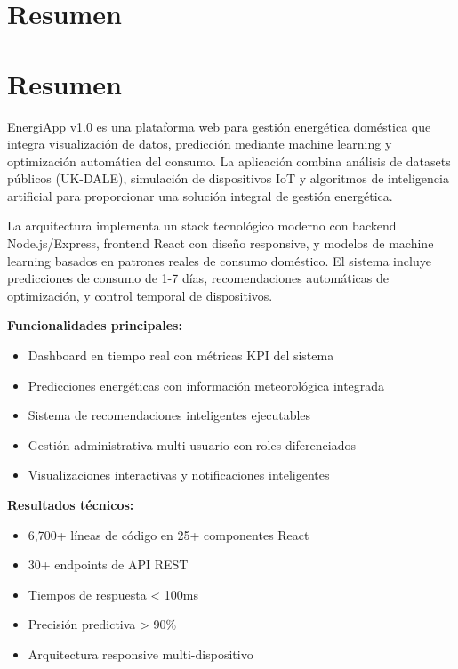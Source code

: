 \documentclass[12pt,a4paper,spanish]{book}
\begin{document}
\frontmatter

\chapter*{Resumen}

\chapter*{Resumen}

EnergiApp v1.0 es una plataforma web para gestión energética doméstica que integra visualización de datos, predicción mediante machine learning y optimización automática del consumo. La aplicación combina análisis de datasets públicos (UK-DALE), simulación de dispositivos IoT y algoritmos de inteligencia artificial para proporcionar una solución integral de gestión energética.

La arquitectura implementa un stack tecnológico moderno con backend Node.js/Express, frontend React con diseño responsive, y modelos de machine learning basados en patrones reales de consumo doméstico. El sistema incluye predicciones de consumo de 1-7 días, recomendaciones automáticas de optimización, y control temporal de dispositivos.

\textbf{Funcionalidades principales:}
\begin{itemize}
    \item Dashboard en tiempo real con métricas KPI del sistema
    \item Predicciones energéticas con información meteorológica integrada
    \item Sistema de recomendaciones inteligentes ejecutables
    \item Gestión administrativa multi-usuario con roles diferenciados
    \item Visualizaciones interactivas y notificaciones inteligentes
\end{itemize}

\textbf{Resultados técnicos:}
\begin{itemize}
    \item 6,700+ líneas de código en 25+ componentes React
    \item 30+ endpoints de API REST
    \item Tiempos de respuesta < 100ms
    \item Precisión predictiva > 90\%
    \item Arquitectura responsive multi-dispositivo
\end{itemize}
\end{document}
